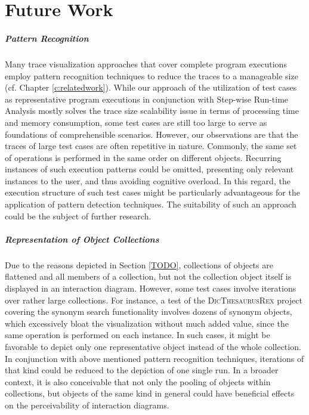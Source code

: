 \chapter{Future Work}
\label{c:futurework}

\paragraph{Pattern Recognition} Many trace visualization approaches that cover complete program executions employ pattern recognition techniques to reduce the traces to a manageable size (cf. Chapter \ref{c:relatedwork}).
While our approach of the utilization of test cases as representative program executions in conjunction with Step-wise Run-time Analysis mostly solves the trace size scalability issue in terms of processing time and memory consumption, some test cases are still too large to serve as foundations of comprehensible scenarios.
However, our observations are that the traces of large test cases are often repetitive in nature. Commonly, the same set of operations is performed in the same order on different objects.
Recurring instances of such execution patterns could be omitted, presenting only relevant instances to the user, and thus avoiding cognitive overload.
In this regard, the execution structure of such test cases might be particularly advantageous for the application of pattern detection techniques.
The suitability of such an approach could be the subject of further research.

\paragraph{Representation of Object Collections} Due to the reasons depicted in Section \ref{TODO}, collections of objects are flattened and all members of a collection, but not the collection object itself is displayed in an interaction diagram. However, some test cases involve iterations over rather large collections.
For instance, a test of the \textsc{DicThesaurusRex} project covering the synonym search functionality involves dozens of synonym objects, which excessively bloat the visualization without much added value, since the same operation is performed on each instance.
In such cases, it might be favorable to depict only one representative object instead of the whole collection.
In conjunction with above mentioned pattern recognition techniques, iterations of that kind could be reduced to the depiction of one single run.
In a broader context, it is also conceivable that not only the pooling of objects within collections, but objects of the same kind in general could have beneficial effects on the perceivability of interaction diagrams.

